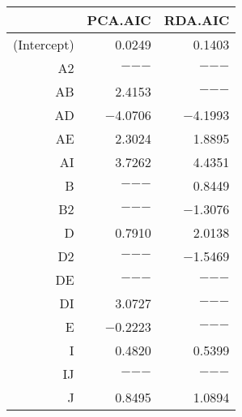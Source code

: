 \begin{table}[ht]
\centering
{\small
\begin{tabular}{rrr}
  \toprule
 & PCA.AIC & RDA.AIC \\ 
  \midrule
(Intercept) & 0.0249 & 0.1403 \\ 
  A2 & $-$$-$$-$ & $-$$-$$-$ \\ 
  AB & 2.4153 & $-$$-$$-$ \\ 
  AD & $-$4.0706 & $-$4.1993 \\ 
  AE & 2.3024 & 1.8895 \\ 
  AI & 3.7262 & 4.4351 \\ 
  B & $-$$-$$-$ & 0.8449 \\ 
  B2 & $-$$-$$-$ & $-$1.3076 \\ 
  D & 0.7910 & 2.0138 \\ 
  D2 & $-$$-$$-$ & $-$1.5469 \\ 
  DE & $-$$-$$-$ & $-$$-$$-$ \\ 
  DI & 3.0727 & $-$$-$$-$ \\ 
  E & $-$0.2223 & $-$$-$$-$ \\ 
  I & 0.4820 & 0.5399 \\ 
  IJ & $-$$-$$-$ & $-$$-$$-$ \\ 
  J & 0.8495 & 1.0894 \\ 
   \bottomrule
\end{tabular}
}
\end{table}
